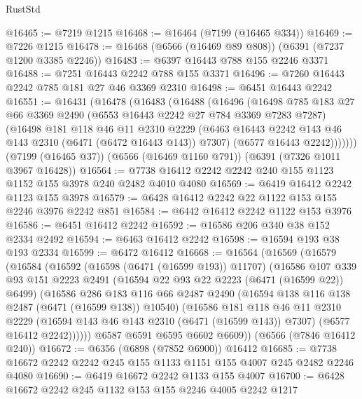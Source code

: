 \begin{lexlean}{RustStd}
\begin{coremodule}
{\begin{coremodule}
{{{{{{{{{{{{{{{{{{{{{{{{{{@16465 := @7219 @1215
@16468 := @16464 (@7199 (@16465 @334))
@16469 := @7226 @1215
@16478 := @16468 (@6566 (@16469 @89 @808)) (@6391 (@7237 @1200 @3385 @2246))
@16483 := @6397 @16443 @788 @155 @2246 @3371
@16488 := @7251 @16443 @2242 @788 @155 @3371
@16496 := @7260 @16443 @2242 @785 @181 @27 @46 @3369 @2310
@16498 := @6451 @16443 @2242
@16551 := @16431
    (@16478
      (@16483
        (@16488
          (@16496
            (@16498
              @785
              @183
              @27
              @66
              @3369
              @2490
              (@6553 @16443 @2242 @27 @784 @3369 @7283 @7287)
              (@16498
                @181
                @118
                @46
                @11
                @2310
                @2229
                (@6463 @16443 @2242 @143 @46 @143 @2310 (@6471 (@6472 @16443 @143)) @7307)
                (@6577 @16443 @2242)))))))
    (@7199 (@16465 @37))
    (@6566 (@16469 @1160 @791))
    (@6391 (@7326 @1011 @3967 @16428))
@16564 := @7738 @16412 @2242 @2242 @240 @155 @1123 @1152 @155 @3978 @240 @2482 @4010 @4080
@16569 := @6419 @16412 @2242 @1123 @155 @3978
@16579 := @6428 @16412 @2242 @22 @1122 @153 @155 @2246 @3976 @2242 @851
@16584 := @6442 @16412 @2242 @1122 @153 @3976
@16586 := @6451 @16412 @2242
@16592 := @16586 @206 @340 @38 @152 @2334 @2492
@16594 := @6463 @16412 @2242
@16598 := @16594 @193 @38 @193 @2334
@16599 := @6472 @16412
@16668 := @16564
    (@16569
      (@16579
        (@16584
          (@16592
            (@16598 (@6471 (@16599 @193)) @11707)
            (@16586
              @107
              @339
              @93
              @151
              @2223
              @2491
              (@16594 @22 @93 @22 @2223 (@6471 (@16599 @22)) @6499)
              (@16586
                @286
                @183
                @116
                @66
                @2487
                @2490
                (@16594 @138 @116 @138 @2487 (@6471 (@16599 @138)) @10540)
                (@16586
                  @181
                  @118
                  @46
                  @11
                  @2310
                  @2229
                  (@16594 @143 @46 @143 @2310 (@6471 (@16599 @143)) @7307)
                  (@6577 @16412 @2242))))))
        @6587
        @6591
        @6595
        @6602
        @6609))
    (@6566 (@7846 @16412 @240))
@16672 := @6356 (@6898 (@7852 @6900)) @16412
@16685 := @7738 @16672 @2242 @2242 @245 @155 @1133 @1151 @155 @4007 @245 @2482 @2246 @4080
@16690 := @6419 @16672 @2242 @1133 @155 @4007
@16700 := @6428 @16672 @2242 @245 @1132 @153 @155 @2246 @4005 @2242 @1217
}}}}}}}}}}}}}}}}}}}}}}}}}}
\end{coremodule}}
\end{coremodule}
\end{lexlean}
